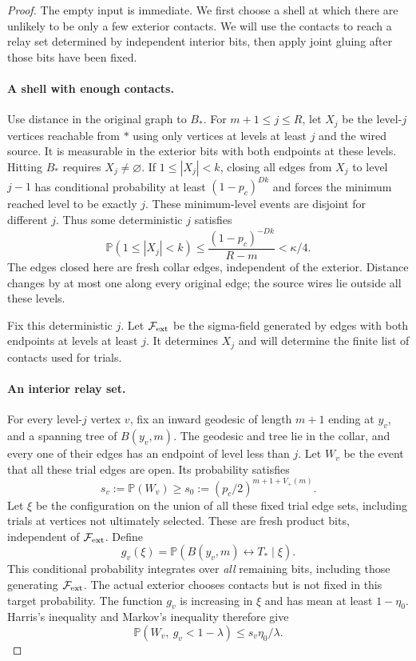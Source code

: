 \documentclass[11pt]{article}
\theoremstyle{definition}
\newcommand{\PP}{\mathbb P}
\newcommand{\pc}{p_c}
\begin{document}
\begin{proof}
The empty input is immediate. We first choose a shell at which there
are unlikely to be only a few exterior contacts. We will use the
contacts to reach a relay set determined by independent interior bits,
then apply joint gluing after those bits have been fixed.

\paragraph{A shell with enough contacts.}
Use distance in the original graph to
$B_*$. For $m+1\le j\le R$, let $X_j$ be the level-$j$ vertices
reachable from $*$ using only vertices at levels at least $j$ and
the wired source. It is measurable in the exterior bits with both
endpoints at these levels. Hitting $B_*$ requires $X_j\ne\varnothing$.
If $1\le|X_j|<k$, closing all edges from $X_j$ to level $j-1$
has conditional probability at least $(1-\pc)^{Dk}$ and forces the
minimum reached level to be exactly $j$. These minimum-level events
are disjoint for different $j$. Thus some deterministic $j$ satisfies
\begin{equation}\label{eq:few-contacts}
 \PP(1\le|X_j|<k)
 \le\frac{(1-\pc)^{-Dk}}{R-m}<\kappa/4.
\end{equation}
The edges closed here are fresh collar edges, independent of the
exterior. Distance changes by at most one along every original edge;
the source wires lie outside all these levels.

Fix this deterministic $j$. Let $\mathcal F_{\rm ext}$ be the
sigma-field generated by edges with both endpoints at levels at least
$j$. It determines $X_j$ and will determine the finite list of contacts
used for trials.

\paragraph{An interior relay set.}
For every level-$j$ vertex $v$, fix an inward geodesic of length
$m+1$ ending at $y_v$, and a spanning tree of $B(y_v,m)$. The geodesic
and tree lie in the collar, and every one of their edges has an
endpoint of level less than $j$. Let $W_v$ be the event that all
these trial edges are open. Its probability satisfies
\[
 s_v:=\PP(W_v)\ge s_0:=(\pc/2)^{m+1+V_+(m)}.
\]
Let $\xi$ be the configuration on the union of all these fixed trial
edge sets, including trials at vertices not ultimately selected.
These are fresh product bits, independent of $\mathcal F_{\rm ext}$.
Define
\[
 g_v(\xi)=\PP(B(y_v,m)\leftrightarrow T_*\mid\xi).
\]
This conditional probability integrates over \emph{all} remaining
bits, including those generating $\mathcal F_{\rm ext}$. The actual
exterior chooses contacts but is not fixed in this target probability.
The function $g_v$ is increasing in $\xi$ and has
mean at least $1-\eta_0$. Harris's inequality and Markov's inequality
therefore give
\begin{equation}\label{eq:good-trial}
 \PP(W_v,\ g_v<1-\lambda)\le s_v\eta_0/\lambda.
\end{equation}


\end{proof}
\end{document}
